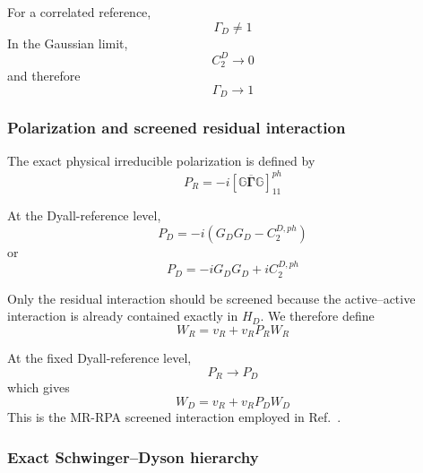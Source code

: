 \documentclass[aip,jcp,reprint,noshowkeys,superscriptaddress]{revtex4-1}
\begin{document}
For a correlated reference,
\begin{equation}
  \Gamma_D\neq1
\end{equation}
In the Gaussian limit,
\begin{equation}
  C_2^D\rightarrow0
\end{equation}
and therefore
\begin{equation}
  \Gamma_D\rightarrow1
\end{equation}


\subsubsection{Polarization and screened residual interaction}

The exact physical irreducible polarization is defined by
\begin{equation}
  P_R
  =
  -i
  \left[
    \mathbb G
    \overline{\boldsymbol\Gamma}
    \mathbb G
  \right]_{11}^{ph}
  \label{eq:mr-polarization}
\end{equation}

At the Dyall-reference level,
\begin{equation}
  P_D
  =
  -i
  \left(
    G_DG_D
    -
    C_2^{D,ph}
  \right)
  \label{eq:dyall-polarization}
\end{equation}
or
\begin{equation}
  P_D
  =
  -iG_DG_D
  +
  iC_2^{D,ph}
\end{equation}

Only the residual interaction should be screened because the
active--active interaction is already contained exactly in $H_D$.  We
therefore define
\begin{equation}
  W_R
  =
  v_R
  +
  v_RP_RW_R
  \label{eq:residual-screening}
\end{equation}

At the fixed Dyall-reference level,
\begin{equation}
  P_R\rightarrow P_D
\end{equation}
which gives
\begin{equation}
  W_D
  =
  v_R
  +
  v_RP_DW_D
  \label{eq:dyall-screening}
\end{equation}
This is the MR-RPA screened interaction employed in
Ref.~\cite{WangFangLi2026}.


\subsubsection{Exact Schwinger--Dyson hierarchy}
\end{document}
